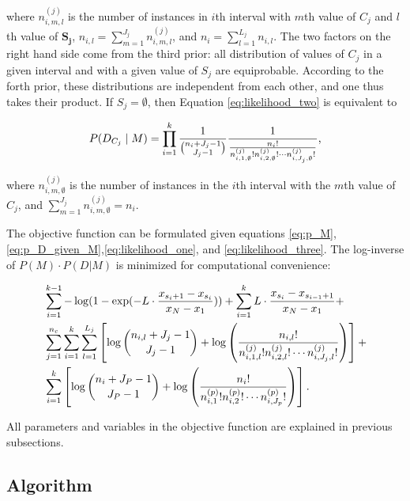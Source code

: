\noindent
where $n^{(j)}_{i,m,l}$ is the number of instances in $i$th interval with $m$th value of $C_j$ and $l$th value of $\boldsymbol{S_j}$, $n_{i,l} = \sum_{m=1}^{J_j} n^{(j)}_{i,m,l}$, and $n_i = \sum_{l=1}^{L_j} n_{i,l}$.
The two factors on the right hand side come from the third prior: all distribution of values of $C_j$ in a given interval and with a given value of $S_j$ are equiprobable. According to the forth prior, these distributions are independent from each other, and one thus takes their product. If $S_j = \emptyset$, then Equation \ref{eq:likelihood_two} is equivalent to

\begin{equation}
\label{eq:likelihood_three}
P(D_{C_j}  \mid M) =
\prod_{i=1}^{k}  {{1}\over{{n_{i} + J_j - 1}\choose{J_j-1}}}
{{1}\over{ {{n_{i}}!}\over{ {n^{(j)}_{i,1,\emptyset} !} {n^{(j)}_{i,2,\emptyset} !} \cdots {n^{(j)}_{i,J_j,\emptyset} !}}  }}\text{,}
\end{equation}

\noindent
where $n^{(j)}_{i,m,\emptyset}$ is the number of instances in the $i$th interval with the $m$th value of $C_j$, and $\sum_{m=1}^{J_j} n^{(j)}_{i,m,\emptyset} = n_i$.

The objective function can be formulated given equations \ref{eq:p_M}, \ref{eq:p_D_given_M},\ref{eq:likelihood_one}, and \ref{eq:likelihood_three}.
The log-inverse of $P(M) \cdot P(D|M)$ is minimized for computational convenience:

\begin{equation}
\label{eq:opt_prob}
\begin{aligned}
& \sum_{i=1}^{k-1} - \log(1 - {\exp(- L \cdot {{x_{s_i+1} - x_{s_i}}\over{x_N - x_1}})}) +  \sum_{i=1}^{k} L \cdot {{x_{s_{i}} - x_{s_{i-1} + 1}}\over{x_N - x_1}} +\\
&  \sum_{j=1}^{n_c} \sum_{i=1}^{k}  \sum_{l=1}^{L_j} \left[  \log{{n_{i,l} + J_j - 1}\choose{J_j-1}} + \log \left( { {{n_{i,l}}!}\over{ {n^{(j)}_{i,1,l} !} {n^{(j)}_{i,2,l} !} \cdots {n^{(j)}_{i,J_j,l} !}} } \right) \right] + \\
& \sum_{i=1}^k \left[  \log {{n_{i} + J_P - 1}\choose{J_P-1}} + \log \left( { {{n_i}!}\over{ {n^{(p)}_{i,1} !} {n^{(p)}_{i,2} !} \cdots {n^{(p)}_{i,J_p} !}} } \right) \right]\text{.}
\end{aligned}
\end{equation}

All parameters and variables in the objective function are explained in previous subsections.

\subsection{Algorithm}

